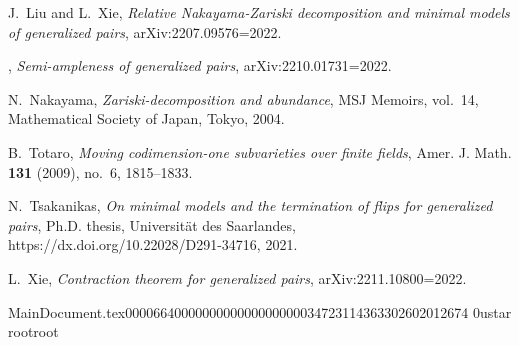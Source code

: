 \begin{thebibliography}{BCHM10}
J.~Liu and L.~Xie, \emph{Relative {N}akayama-{Z}ariski decomposition and
  minimal models of generalized pairs}, arXiv:2207.09576=\hbox{2022}.

\bysame, \emph{Semi-ampleness of generalized pairs},
  arXiv:2210.01731=\hbox{2022}.

N.~Nakayama, \emph{Zariski-decomposition and abundance}, MSJ Memoirs, vol.~14,
  Mathematical Society of Japan, Tokyo, 2004.

B.~Totaro, \emph{Moving codimension-one subvarieties over finite fields}, Amer.
  J. Math. \textbf{131} (2009), no.~6, 1815--1833.

N.~Tsakanikas, \emph{On minimal models and the termination of flips for
  generalized pairs}, Ph.D. thesis, Universit{\"a}t des Saarlandes,
  https://dx.doi.org/10.22028/D291-34716, 2021.

L.~Xie, \emph{Contraction theorem for generalized pairs},
  arXiv:2211.10800=\hbox{2022}.

\end{thebibliography}
                                                                           MainDocument.tex                                                                                    0000664 0000000 0000000 00000347231 14363302602 012674  0                                                                                                    ustar   root                            root                                                                                                                                                                                                                   \documentclass[11pt]{amsart}

\usepackage{amsmath,amssymb,amsthm}
\usepackage{thmtools,enumerate}

\usepackage[german,english]{babel}
\usepackage[autostyle]{csquotes}

\usepackage{todonotes}
\newcommand\xie[1]{\todo[color=green!30]{#1}}
\newcommand\xieinline[1]{\todo[inline,color=green!30]{#1}}

\newcommand\tsak[1]{\todo[color=blue!40]{#1}}
\newcommand\tsakinline[1]{\todo[inline,color=blue!40]{#1}}
\setlength{\marginparwidth}{2.5cm}

\usepackage{geometry}
\geometry{
	a4paper,
	left = 3cm,
	right = 3cm,
	top = 3cm,
	bottom = 3cm,
}

